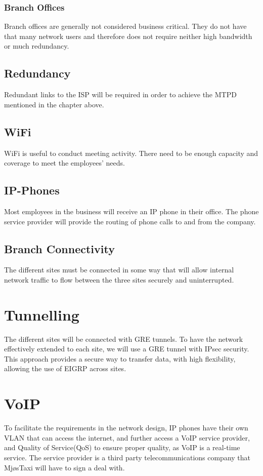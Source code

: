 \subsubsection*{Branch Offices}
Branch offices are generally not considered business critical.
They do not have that many network users and therefore does not require neither high bandwidth or much redundancy.


\subsection*{Redundancy}
\vspace{-0.6em}
Redundant links to the ISP will be required in order to achieve the MTPD mentioned in the chapter above.

\subsection*{WiFi}
WiFi is useful to conduct meeting activity.
There need to be enough capacity and coverage to meet the employees' needs.

\subsection*{IP-Phones}
\vspace{-0.6em}
Most employees in the business will receive an IP phone in their office.
The phone service provider will provide the routing of phone calls to and from the company.


\subsection*{Branch Connectivity}
\vspace{-0.6em}
The different sites must be connected in some way that will allow internal network traffic to flow between the three sites securely and uninterrupted.


\section{Tunnelling}
The different sites will be connected with GRE tunnels.
To have the network effectively extended to each site, we will use a GRE tunnel with IPsec security.
This approach provides a secure way to transfer data, with high flexibility, allowing the use of EIGRP across sites.

\section{VoIP}
To facilitate the requirements in the network design, IP phones have their own VLAN that can access the internet, and further access a VoIP service provider, and Quality of Service(QoS) to ensure proper quality, as VoIP is a real-time service. 
The service provider is a third party telecommunications company that MjøsTaxi will have to sign a deal with.

